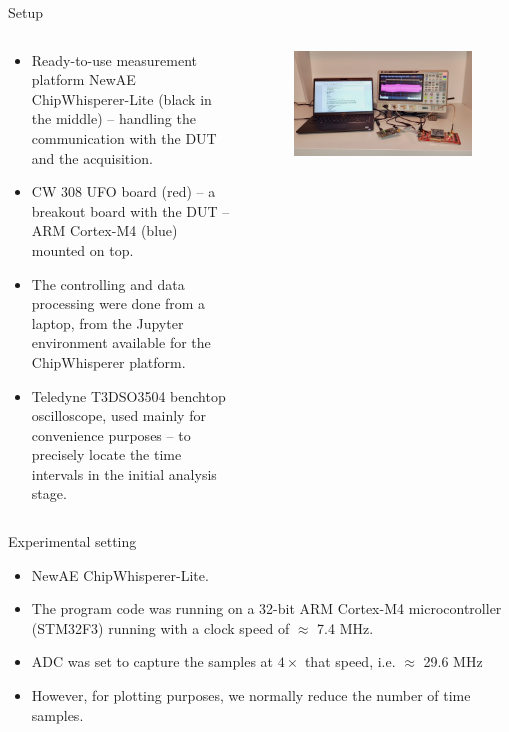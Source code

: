 \begin{frame}{Setup}
    \begin{columns}[T] %
\begin{column}{.55\textwidth}
\begin{itemize}
    \item Ready-to-use measurement platform NewAE ChipWhisperer-Lite (black in the middle) -- handling the communication with the DUT and the acquisition.
    \item CW 308 UFO board (red) -- a breakout board with the DUT -- ARM Cortex-M4 (blue) mounted on top.
    \item The controlling and data processing were done from a laptop, from the Jupyter environment available for the ChipWhisperer platform.
    \item Teledyne T3DSO3504 benchtop oscilloscope, used mainly for convenience purposes -- to precisely locate the time intervals in the initial analysis stage.
\end{itemize}
\end{column}%
\hfill%
\begin{column}{.45\textwidth}
\begin{figure}
    \includegraphics[width=1.1\textwidth]{fig/sca_setup.jpeg}
\end{figure}
\end{column}%
\end{columns}
\end{frame}

\begin{frame}{Experimental setting}
    \begin{itemize}
        \item NewAE ChipWhisperer-Lite. 
       \item The program code was running on a 32-bit ARM Cortex-M4 microcontroller (STM32F3) running with a clock speed of $\approx$ 7.4 MHz.
       \item ADC was set to capture the samples at $4\times$ that speed, i.e. $\approx$ 29.6 MHz
        \item However, for plotting purposes, we normally reduce the number of time samples.
    \end{itemize}
\end{frame}

